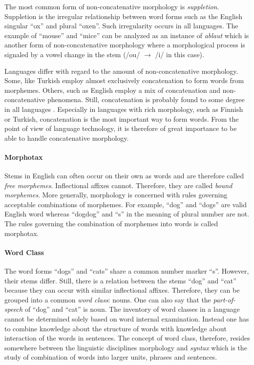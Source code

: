 The most common form of non-concatenative morphology is {\it
  suppletion}. Suppletion is the irregular relationship between word
forms such as the English singular ``ox'' and plural ``oxen''. Such
irregularity occurs in all languages. The example of ``mouse'' and
``mice'' can be analyzed as an instance of {\it ablaut} which is
another form of non-concatenative morphology where a morphological
process is signaled by a vowel change in the stem (/ou/ $\rightarrow$
/i/ in this case).

Languages differ with regard to the amount of non-concatenative
morphology. Some, like Turkish employ almost exclusively concatenation
to form words from morphemes. Others, such as English employ a mix of
concatenation and non-concatenative phenomena. Still, concatenation is
probably found to some degree in all languages
\cite{someone}. Especially in languages with rich morphology, such as
Finnish or Turkish, concatenation is the most important way to form
words. From the point of view of language technology, it is therefore
of great importance to be able to handle concatenative morphology.

\paragraph{Morphotax} Stems in English can often occur on their own as
words and are therefore called {\it free morphemes}. Inflectional
affixes cannot. Therefore, they are called {\it bound morphemes}. More
generally, morphology is concerned with rules governing acceptable
combinations of morphemes. For example, ``dog'' and ``dogs'' are valid
English word whereas ``dogdog'' and ``s'' in the meaning of plural
number are not. The rules governing the combination of morphemes into
words is called morphotax.

\paragraph{Word Class} The word forms ``dogs'' and ``cats'' share a
common number marker ``s''. However, their stems differ. Still, there
is a relation between the stems ``dog'' and ``cat'' because they can
occur with similar inflectional affixes. Therefore, they can be
grouped into a common {\it word class}: nouns. One can also say that
the {\it part-of-speech} of ``dog'' and ``cat'' is noun.  The
inventory of word classes in a language cannot be determined solely
based on word internal examination. Instead one has to combine
knowledge about the structure of words with knowledge about
interaction of the words in sentences. The concept of word class,
therefore, resides somewhere between the linguistic disciplines
morphology and {\it syntax} which is the study of combination of words
into larger units, phrases and sentences.

